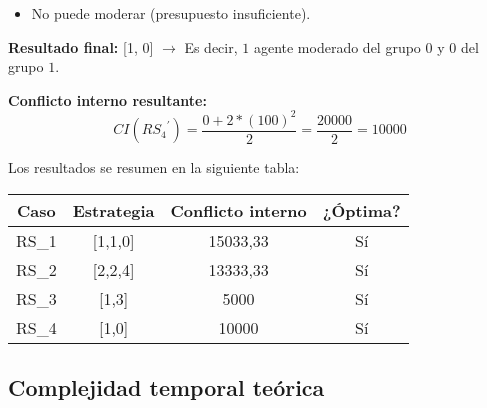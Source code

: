\begin{enumerate}
\begin{itemize}
\begin{itemize}
					\item No puede moderar (presupuesto insuficiente).
				\end{itemize}
		\end{itemize}

		\textbf{Resultado final:} [1, 0] $\rightarrow$ Es decir, $1$ agente moderado del grupo $0$ y $0$ del grupo $1$.

		\textbf{Conflicto interno resultante:}
		\begin{equation}
			CI\left( { RS_4 }^\prime \right) = \frac{ 0 + 2 * (100)^2 }{ 2 } = \frac{ 20000 }{ 2 } = 10000
		\end{equation}
\end{enumerate}

Los resultados se resumen en la siguiente tabla:

\begin{table}[h]
	\centering
	\begin{tabular}{|c|c|c|c|}
		\hline
		\textbf{Caso} & \textbf{Estrategia} & \textbf{Conflicto interno} & \textbf{¿Óptima?} \\ \hline
		RS\_1 & [1,1,0] & 15033,33 & Sí \\ \hline
		RS\_2 & [2,2,4] & 13333,33 & Sí \\ \hline
		RS\_3 & [1,3]   & 5000     & Sí \\ \hline
		RS\_4 & [1,0]   & 10000    & Sí \\ \hline
	\end{tabular}
\end{table}

\subsection{Complejidad temporal teórica}

